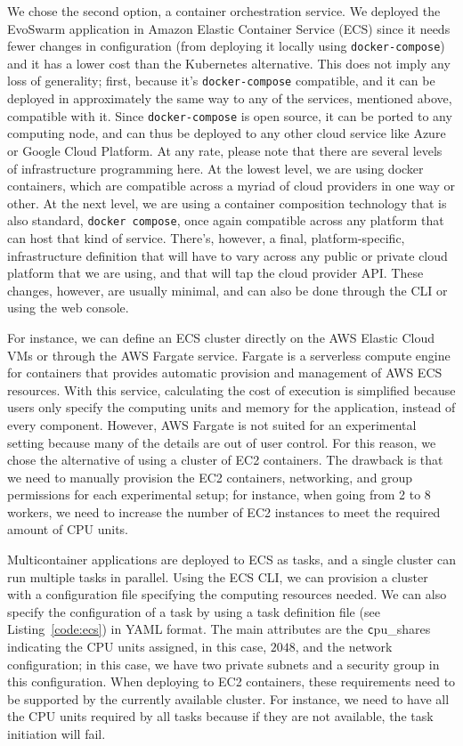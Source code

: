 \documentclass[review]{elsarticle}
\begin{document}
We chose the second option, a container orchestration service. We
deployed the EvoSwarm application in Amazon Elastic Container Service (ECS)
since it needs fewer changes in configuration (from deploying it locally using
{\tt docker-compose}) and it has a lower cost than the Kubernetes
alternative. This does not imply any loss of generality; first,
because it's {\tt docker-compose} compatible, and it can be deployed
in approximately the same way to any of the services, mentioned above,
compatible with it. Since {\tt docker-compose} is open source, it can
be ported to any computing node, and can thus be deployed to any other
cloud service like Azure or Google Cloud Platform. At any rate, please
note that there are several levels of infrastructure programming
here. At the lowest level, we are using docker containers, which are
compatible across a myriad of cloud providers in one way or other. At
the next level, we are using a container composition technology that
is also standard, {\tt docker compose}, once again compatible across
any platform that can host that kind of service. There's, however, a
final, platform-specific, infrastructure definition that will have to
vary across any public or private cloud platform that we are using,
and that will tap the cloud provider API. These changes, however, are
usually minimal, and can also be done through the CLI or using the web
console.

For instance, we can define an ECS cluster directly on the AWS Elastic Cloud VMs or through the
AWS Fargate service. Fargate is a serverless compute engine for containers that
provides automatic provision and management of AWS ECS resources. With this
service, calculating the cost of execution is simplified because users only
specify the computing units and memory for the application, instead of every
component. However, AWS Fargate is not suited for an experimental setting because
many of the details are out of user control. For this reason, we chose the
alternative of using a cluster of EC2 containers. The drawback is that we need to manually
provision the  EC2 containers, networking, and group permissions for each
experimental setup; for instance, when going from 2 to 8 workers, we need to increase the
number of EC2 instances to meet the required amount of CPU units.

Multicontainer applications are deployed to ECS as tasks, and a single cluster can run multiple tasks in
parallel. Using the ECS CLI, we can provision a cluster with a configuration file
specifying the computing resources needed. We can also specify the configuration of a task 
by using a task definition file (see Listing~\ref{code:ecs}) in YAML format.
The main attributes are the {\texttt cpu\_shares} indicating the CPU units
assigned, in this case, $2048$, and the network configuration; in this case, we have two private 
subnets and a security group in this configuration. When deploying to EC2 containers, these requirements
need to be supported by the currently available cluster. For instance, we need to have all 
the CPU units required by all tasks because if they are not available, the task initiation will fail.
\end{document}
